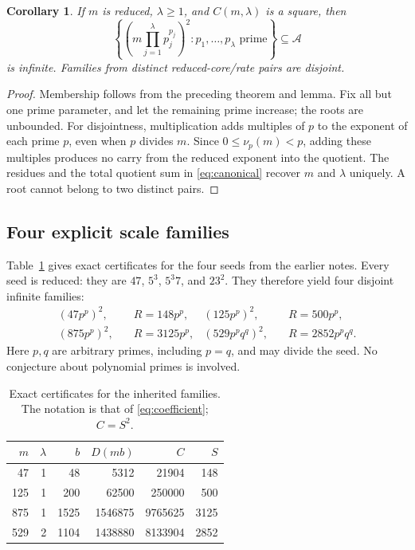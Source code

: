 \documentclass[11pt]{article}
\newtheorem{corollary}[theorem]{Corollary}
\theoremstyle{definition}
\theoremstyle{remark}
\begin{document}
\begin{corollary}\label{cor:infinite}
If $m$ is reduced, $\lambda\geq1$, and $C(m,\lambda)$ is a square, then
\[
 \left\{\left(m\prod_{j=1}^{\lambda}p_j^{p_j}\right)^{2}:
       p_1,\ldots,p_\lambda\text{ prime}\right\}\subseteq\mathcal A
\]
is infinite. Families from distinct reduced-core/rate pairs are disjoint.
\end{corollary}
\begin{proof}
Membership follows from the preceding theorem and lemma. Fix all but one
prime parameter, and let the remaining prime increase; the roots are
unbounded. For disjointness, multiplication adds multiples of $p$ to
the exponent of each prime $p$, even when $p$ divides $m$. Since
$0\leq\nu_p(m)<p$, adding these multiples produces no carry from
the reduced exponent into the quotient. The residues
and the total quotient sum in \eqref{eq:canonical} recover $m$ and
$\lambda$ uniquely. A root cannot belong to two distinct pairs.
\end{proof}

\subsection{Four explicit scale families}\label{sec:four}
Table~\ref{tab:four} gives exact certificates for the four seeds from
the earlier notes.
Every seed is reduced: they are $47$, $5^{3}$, $5^{3}7$, and $23^{2}$.
They therefore yield four disjoint infinite families:
\begin{align*}
 (47p^{p})^{2},&\quad R=148p^{p},&
 (125p^{p})^{2},&\quad R=500p^{p},\\
 (875p^{p})^{2},&\quad R=3125p^{p},&
 (529p^{p}q^{q})^{2},&\quad R=2852p^{p}q^{q}.
\end{align*}
Here $p,q$ are arbitrary primes, including $p=q$, and may divide the
seed. No conjecture about polynomial primes is involved.

\begin{table}[htbp]
\centering
\caption{Exact certificates for the inherited families. The notation is
that of \eqref{eq:coefficient}; $C=S^{2}$.}\label{tab:four}
\begin{tabular}{rrrrrr}
\toprule
$m$&$\lambda$&$b$&$D(mb)$&$C$&$S$\\
\midrule
47&1&48&5312&21904&148\\
125&1&200&62500&250000&500\\
875&1&1525&1546875&9765625&3125\\
529&2&1104&1438880&8133904&2852\\
\bottomrule
\end{tabular}
\end{table}
\end{document}

